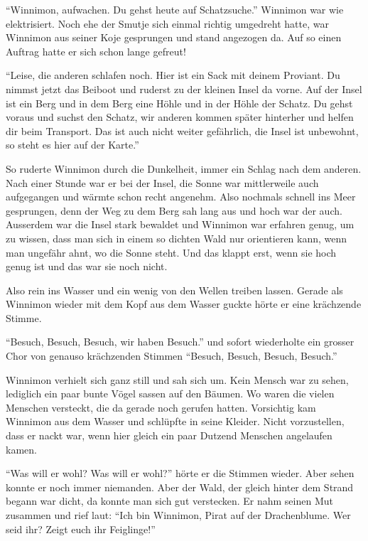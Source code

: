 \enquote{Winnimon, aufwachen. Du gehst heute auf Schatzsuche.} Winnimon war wie elektrisiert. Noch ehe der Smutje sich einmal richtig umgedreht hatte, war Winnimon aus seiner Koje gesprungen und stand angezogen da. Auf so einen Auftrag hatte er sich schon lange gefreut!

\enquote{Leise, die anderen schlafen noch. Hier ist ein Sack mit deinem Proviant. Du nimmst jetzt das Beiboot und ruderst zu der kleinen Insel da vorne. Auf der Insel ist ein Berg und in dem Berg eine Höhle und in der Höhle der Schatz. Du gehst voraus und suchst den Schatz, wir anderen kommen später hinterher und helfen dir beim Transport. Das ist auch nicht weiter gefährlich, die Insel ist unbewohnt, so steht es hier auf der Karte.}

So ruderte Winnimon durch die Dunkelheit, immer ein Schlag nach dem anderen. Nach einer Stunde war er bei der Insel, die Sonne war mittlerweile auch aufgegangen und wärmte schon recht angenehm. Also nochmals schnell ins Meer gesprungen, denn der Weg zu dem Berg sah lang aus und hoch war der auch. Ausserdem war die Insel stark bewaldet und Winnimon war erfahren genug, um zu wissen, dass man sich in einem so dichten Wald nur orientieren kann, wenn man ungefähr ahnt, wo die Sonne steht. Und das klappt erst, wenn sie hoch genug ist und das war sie noch nicht.

Also rein ins Wasser und ein wenig von den Wellen treiben lassen. Gerade als Winnimon wieder mit dem Kopf aus dem Wasser guckte hörte er eine krächzende Stimme.

\enquote{Besuch, Besuch, Besuch, wir haben Besuch.} und sofort wiederholte ein grosser Chor von genauso krächzenden Stimmen \enquote{Besuch, Besuch, Besuch, Besuch.}

Winnimon verhielt sich ganz still und sah sich um. Kein Mensch war zu sehen, lediglich ein paar bunte Vögel sassen auf den Bäumen. Wo waren die vielen Menschen versteckt, die da gerade noch gerufen hatten. Vorsichtig kam Winnimon aus dem Wasser und schlüpfte in seine Kleider. Nicht vorzustellen, dass er nackt war, wenn hier gleich ein paar Dutzend Menschen angelaufen kamen.

\enquote{Was will er wohl? Was will er wohl?} hörte er die Stimmen wieder. Aber sehen konnte er noch immer niemanden. Aber der Wald, der gleich hinter dem Strand begann war dicht, da konnte man sich gut verstecken. Er nahm seinen Mut zusammen und rief laut: \enquote{Ich bin Winnimon, Pirat auf der Drachenblume. Wer seid ihr? Zeigt euch ihr Feiglinge!}

